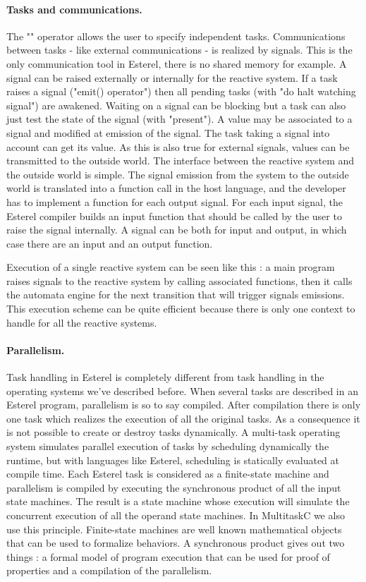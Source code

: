 \documentclass[10pt]{report}
\begin{document}
\paragraph{Tasks and communications.} The "\textbar\textbar" operator allows the user to specify independent tasks. Communications between
tasks - like external communications - is realized by signals. This is the only communication tool in Esterel, there is no
shared memory for example. A signal can be raised externally or internally for the reactive system. If a task raises a signal ("emit() operator") 
then all pending tasks (with "do halt watching signal") are awakened. Waiting on a signal can be blocking but a task can also just test the state 
of the signal (with "present"). A value may be associated to a signal and modified at emission of the signal. The task taking a signal into account 
can get its value. As this is also true for external signals, values can be transmitted to the outside world. The interface between the reactive
system and the outside world is simple. The signal emission from the system to the outside world is translated into a function call
in the host language, and the developer has to implement a function for each output signal. For each input signal, the Esterel
compiler builds an input function that should be called by the user to raise the signal internally. A signal can be both for
input and output, in which case there are an input and an output function.

Execution of a single reactive system can be seen like this : a main program raises signals to the reactive system by
calling associated functions, then it calls the automata engine for the next transition that will trigger signals emissions. This
execution scheme can be quite efficient because there is only one context to handle for all the reactive systems.

\paragraph{Parallelism.} Task handling in Esterel is completely different from task handling in the operating systems we've described before.
When several tasks are described in an Esterel program, parallelism is so to say compiled. After compilation there is only
one task which realizes the execution of all the original tasks. As a consequence it is not possible to create or destroy tasks dynamically. 
A multi-task operating system simulates parallel execution of tasks by scheduling dynamically the runtime, but with languages
like Esterel, scheduling is statically evaluated at compile time. Each Esterel task is considered as a finite-state machine
and parallelism is compiled by executing the synchronous product of all the input state machines. The result is a state machine whose
execution will simulate the concurrent execution of all the operand state machines. In MultitaskC we also use this principle. 
Finite-state machines are well known mathematical objects that can be used to formalize behaviors. A synchronous product gives out 
two things : a formal model of program execution that can be used for proof of properties and a compilation of the parallelism.
\end{document}
